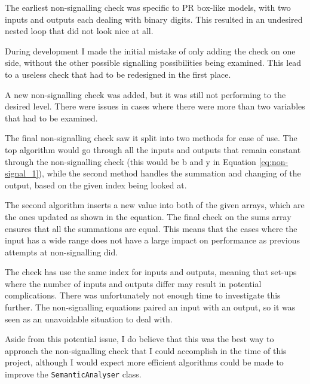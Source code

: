 \documentclass[report.tex]{subfiles}
\begin{document}
The earliest non-signalling check was specific to PR box-like models, with two
inputs and outputs each dealing with binary digits. This resulted in an
undesired nested loop that did not look nice at all.



During development I made the initial mistake of only adding the check on one
side, without the other possible signalling possibilities being examined. This
lead to a useless check that had to be redesigned in the first place.

A new non-signalling check was added, but it was still not performing to the
desired level. There were issues in cases where there were more than two
variables that had to be examined.



The final non-signalling check saw it split into two methods for ease of use.
The top algorithm would go through all the inputs and outputs that remain
constant through the non-signalling check (this would be b and y in Equation
\ref{eq:non-signal_1}), while the second method handles the summation and
changing of the output, based on the given index being looked at.

The second algorithm inserts a new value into both of the given arrays, which
are the ones updated as shown in the equation. The final check on the sums
array ensures that all the summations are equal. This means that the cases where
the input has a wide range does not have a large impact on performance as
previous attempts at non-signalling did.

The check has use the same index for inputs and outputs, meaning that set-ups
where the number of inputs and outputs differ may result in potential
complications. There was unfortunately not enough time to investigate this
further. The non-signalling equations paired an input with an output, so it was
seen as an unavoidable situation to deal with.

Aside from this potential issue, I do believe that this was the best way to
approach the non-signalling check that I could accomplish in the time of this
project, although I would expect more efficient algorithms could be made to
improve the \texttt{SemanticAnalyser} class.
\end{document}
